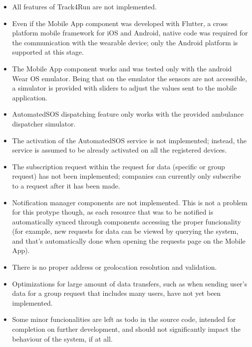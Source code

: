 \documentclass[../main.tex]{subfiles}
\begin{document}
\begin{itemize}
	\item All features of Track4Run are not implemented.
	\item Even if the Mobile App component was developed with Flutter, a cross platform mobile framework for iOS and Android, native code was required for the communication with the wearable device; only the Android platform is supported at this stage.
	\item The Mobile App component works and was tested only with the android Wear OS emulator. Being that on the emulator the sensors are not accessible, a simulator is provided with sliders to adjust the values sent to the mobile application.
	\item AutomatedSOS dispatching feature only works with the provided ambulance dispatcher simulator.
	\item The activation of the AutomatedSOS service is not implemented; instead, the service is assumed to be already activated on all the registered devices.
	\item The subscription request within the request for data (specific or group request) has not been implemented; companies can currently only subscribe to a request after it has been made.
	\item Notification manager components are not implemented. This is not a problem for this protype though, as each resource that was to be notified is automatically synced through components accessing the proper funcionality (for example, new requests for data can be viewed by querying the system, and that's automatically done when opening the requests page on the Mobile App).
	\item There is no proper address or geolocation resolution and validation.
	\item Optimizations for large amount of data transfers, such as when sending user's data for a group request that includes many users, have not yet been implemented.
	\item Some minor funcionalities are left as todo in the source code, intended for completion on further development, and should not significantly impact the behaviour of the system, if at all.
\end{itemize}
\end{document}
